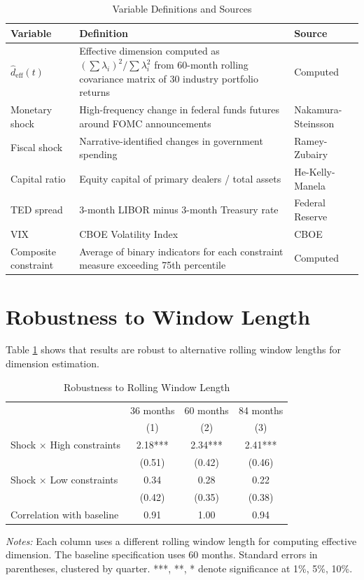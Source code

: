 \documentclass[12pt,letterpaper]{article}
\theoremstyle{plain}
\theoremstyle{definition}
\begin{document}
\begin{table}[htbp]
\centering
\caption{Variable Definitions and Sources}
\begin{tabular}{p{3.5cm}p{9cm}l}
\toprule
Variable & Definition & Source \\
\midrule
$\hat{d}_{\text{eff}}(t)$ & Effective dimension computed as $(\sum \lambda_i)^2 / \sum \lambda_i^2$ from 60-month rolling covariance matrix of 30 industry portfolio returns & Computed \\[1em]
Monetary shock & High-frequency change in federal funds futures around FOMC announcements & Nakamura-Steinsson \\[1em]
Fiscal shock & Narrative-identified changes in government spending & Ramey-Zubairy \\[1em]
Capital ratio & Equity capital of primary dealers / total assets & He-Kelly-Manela \\[1em]
TED spread & 3-month LIBOR minus 3-month Treasury rate & Federal Reserve \\[1em]
VIX & CBOE Volatility Index & CBOE \\[1em]
Composite constraint & Average of binary indicators for each constraint measure exceeding 75th percentile & Computed \\
\bottomrule
\end{tabular}
\end{table}


\section{Robustness to Window Length}\label{app:robustness}

Table \ref{tab:robustness_window} shows that results are robust to alternative rolling window lengths for dimension estimation.

\begin{table}[htbp]
\centering
\caption{Robustness to Rolling Window Length}
\label{tab:robustness_window}
\begin{tabular}{lccc}
\toprule
& 36 months & 60 months & 84 months \\
& (1) & (2) & (3) \\
\midrule
Shock $\times$ High constraints & 2.18*** & 2.34*** & 2.41*** \\
& (0.51) & (0.42) & (0.46) \\[0.3em]
Shock $\times$ Low constraints & 0.34 & 0.28 & 0.22 \\
& (0.42) & (0.35) & (0.38) \\[0.5em]
Correlation with baseline & 0.91 & 1.00 & 0.94 \\
\bottomrule
\end{tabular}

\vspace{0.5em}
\footnotesize
\textit{Notes:} Each column uses a different rolling window length for computing effective dimension. The baseline specification uses 60 months. Standard errors in parentheses, clustered by quarter. ***, **, * denote significance at 1\%, 5\%, 10\%.
\end{table}
\end{document}

